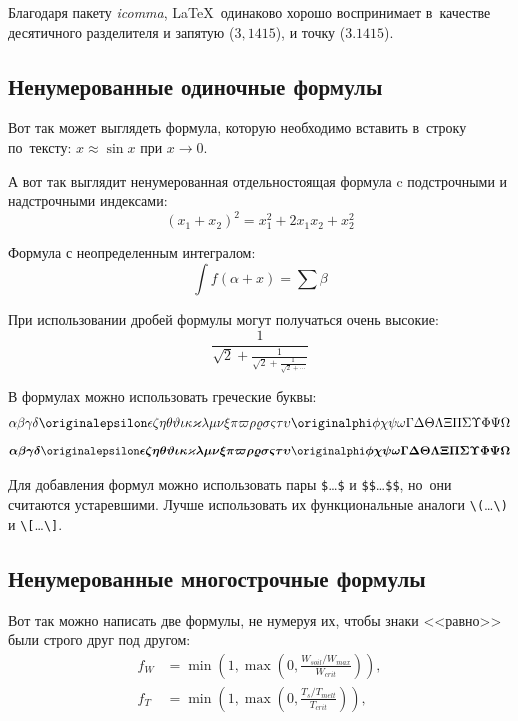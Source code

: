 Благодаря пакету \textit{icomma}, \LaTeX~одинаково хорошо воспринимает
в~качестве десятичного разделителя и запятую (\(3,1415\)), и точку (\(3.1415\)).

\subsection{Ненумерованные одиночные формулы}%

Вот так может выглядеть формула, которую необходимо вставить в~строку
по~тексту: \(x \approx \sin x\) при \(x \to 0\).

А вот так выглядит ненумерованная отдельностоящая формула c подстрочными
и надстрочными индексами:
\[
    (x_1+x_2)^2 = x_1^2 + 2 x_1 x_2 + x_2^2
\]

Формула с неопределенным интегралом:
\[
    \int f(\alpha+x)=\sum\beta
\]

При использовании дробей формулы могут получаться очень высокие:
\[
    \frac{1}{\sqrt{2}+
        \displaystyle\frac{1}{\sqrt{2}+
            \displaystyle\frac{1}{\sqrt{2}+\cdots}}}
\]

В формулах можно использовать греческие буквы:
\[
    \alpha\beta\gamma\delta\originalepsilon\epsilon\zeta\eta\theta%
    \vartheta\iota\kappa\varkappa\lambda\mu\nu\xi\pi\varpi\rho\varrho%
    \sigma\varsigma\tau\upsilon\originalphi\phi\chi\psi\omega\Gamma\Delta%
    \Theta\Lambda\Xi\Pi\Sigma\Upsilon\Phi\Psi\Omega
\]
\[%
    \boldsymbol{\alpha\beta\gamma\delta\originalepsilon\epsilon\zeta\eta%
        \theta\vartheta\iota\kappa\varkappa\lambda\mu\nu\xi\pi\varpi\rho%
        \varrho\sigma\varsigma\tau\upsilon\originalphi\phi\chi\psi\omega\Gamma%
        \Delta\Theta\Lambda\Xi\Pi\Sigma\Upsilon\Phi\Psi\Omega}
\]

Для добавления формул можно использовать пары \verb+$+\dots\verb+$+ и \verb+$$+\dots\verb+$$+,
но~они считаются устаревшими.
Лучше использовать их функциональные аналоги \verb+\(+\dots\verb+\)+ и \verb+\[+\dots\verb+\]+.

\subsection{Ненумерованные многострочные формулы}%

Вот так можно написать две формулы, не нумеруя их, чтобы знаки <<равно>> были
строго друг под другом:
\begin{align}
    f_W & =  \min \left( 1, \max \left( 0, \frac{W_{soil} / W_{max}}{W_{crit}} \right)  \right), \nonumber \\
    f_T & =  \min \left( 1, \max \left( 0, \frac{T_s / T_{melt}}{T_{crit}} \right)  \right), \nonumber
\end{align}

